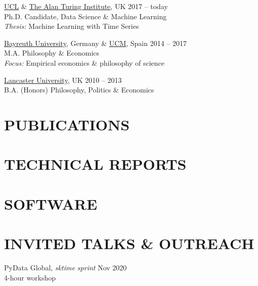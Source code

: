 \documentclass{cv}
\newcommand{\printbibsection}[2]{
\begin{refsection}
\nocite{*}
\printbibliography[sorting=chronological,
                  type={#1},
                  title={#2},
                  heading=none]
\end{refsection}
}
\begin{document}
\href{https://www.ucl.ac.uk/}{UCL} \& \href{https://www.turing.ac.uk/}{The Alan Turing Institute}, UK \hfill 2017 -- today \\
Ph.D. Candidate, Data Science \& Machine Learning \\
{\color{lightgray} \emph{Thesis:} Machine Learning with Time Series} %
\vspace{15pt}

\href{https://www.uni-bayreuth.de/en/}{Bayreuth University}, Germany \& \href{https://www.ucm.es/english}{UCM}, Spain \hfill 2014 -- 2017 \\
M.A. Philosophy \& Economics \\
{\color{lightgray} \emph{Focus:} Empirical economics \& philosophy of science}
\vspace{15pt}

\href{https://www.lancs.ac.uk/}{Lancaster University}, UK \hfill 2010 -- 2013 \\
B.A. (Honors) Philosophy, Politics \& Economics \\


\section{PUBLICATIONS}
\printbibsection{article}{}

\section{TECHNICAL REPORTS}
\printbibsection{proceedings}{}

\section{SOFTWARE}
\printbibsection{misc}{}

\section{INVITED TALKS \& OUTREACH}

PyData Global, \textit{sktime sprint} \hfill Nov 2020 \\
{\color{lightgray} 4-hour workshop} \\
\end{document}

